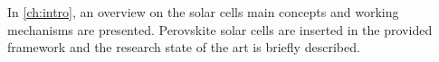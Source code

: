 In \cref{ch:intro}, an overview on the solar cells main concepts and working mechanisms are presented.
Perovskite solar cells are inserted in the provided framework and the research state of the art is briefly described. 